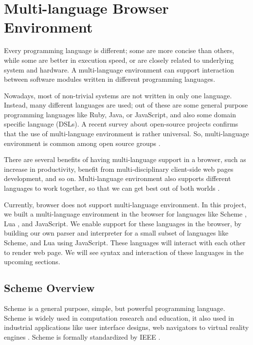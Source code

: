 \section{Multi-language Browser Environment} 

Every programming language is different; some are more concise than others, while some are better in execution speed, or are closely related to underlying system and hardware. A multi-language environment can support interaction between software modules written in different programming languages.

Nowadays, most of non-trivial systems are not written in only one language.
Instead, many different languages are used; out of these are some general purpose programming languages like Ruby, Java, or JavaScript, and also some domain specific language (DSLs). A recent survey about open-source projects confirms that the use of multi-language environment is rather universal. So, multi-language environment is common among open source groups \cite{Mayer2017}.

There are several benefits of having multi-language support in a browser, such as increase in productivity, benefit from multi-disciplinary client-side web pages development, and so on. Multi-language environment also supports different languages to work together, so that we can get best out of both worlds \cite{Matthews:2007:OSM:1190216.1190220}.


Currently, browser does not support multi-language environment. In this project, we built a multi-language environment in the browser for languages like Scheme \cite{Dybvig:2009:SPL:1618542}, Lua \cite{Ierusalimschy:2006:LRM:1215067}, and JavaScript. We enable support for these languages in the browser, by building our own parser and interpreter for a small subset of languages like Scheme, and Lua using JavaScript. These languages will interact with each other to render web page. We will see syntax and interaction of these languages in the upcoming sections. 


\subsection{Scheme Overview}

Scheme \cite{Dybvig:2009:SPL:1618542} is a general purpose, simple, but powerful programming language.
 Scheme is widely used in computation research and education, it also used in industrial applications like user interface designs, web navigators to virtual reality engines \cite{Dybvig:1996:SPL:525334}. Scheme is formally standardized by IEEE \cite{schemeieee}.

